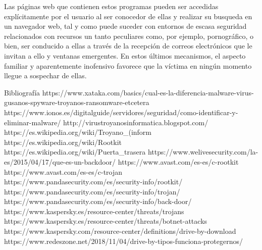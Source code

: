 Las páginas web que contienen estos programas pueden ser accedidas explícitamente por el usuario al ser conocedor de ellas y realizar su busqueda en un navegador web, tal y como puede suceder con entornos de escasa seguridad relacionados con recursos un tanto peculiares como, por ejemplo, pornográfico, o bien, ser conducido a ellas a través de la recepción de correos electrónicos que le invitan a ello y ventanas emergentes. En estos últimos mecanismos, el aspecto familiar y aparentemente inofensivo favorece que la víctima en ningún momento llegue a sospechar de ellas.

Bibliografía
https://www.xataka.com/basics/cual-es-la-diferencia-malware-virus-gusanos-spyware-troyanos-ransomware-etcetera
https://www.ionos.es/digitalguide/servidores/seguridad/como-identificar-y-eliminar-malware/
http://virustroyanosinformatica.blogspot.com/
https://es.wikipedia.org/wiki/Troyano_(inform%
https://es.wikipedia.org/wiki/Rootkit
https://es.wikipedia.org/wiki/Puerta_trasera
https://www.welivesecurity.com/la-es/2015/04/17/que-es-un-backdoor/
https://www.avast.com/es-es/c-rootkit
https://www.avast.com/es-es/c-trojan
https://www.pandasecurity.com/es/security-info/rootkit/
https://www.pandasecurity.com/es/security-info/trojan/
https://www.pandasecurity.com/es/security-info/back-door/
https://www.kaspersky.es/resource-center/threats/trojans
https://www.kaspersky.es/resource-center/threats/botnet-attacks
https://www.kaspersky.com/resource-center/definitions/drive-by-download
https://www.redeszone.net/2018/11/04/drive-by-tipos-funciona-protegernos/